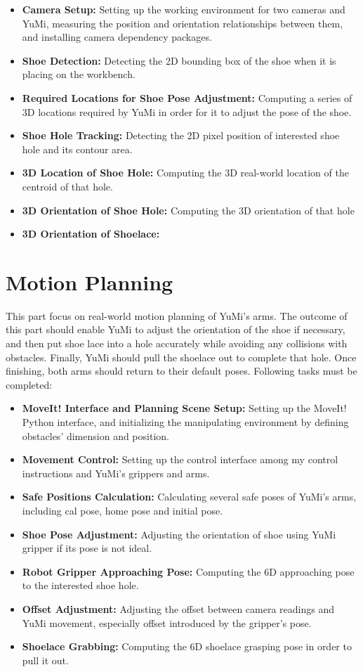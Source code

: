 \begin{itemize}
    \item \textbf{Camera Setup:} Setting up the working environment for two cameras and YuMi, measuring the position and orientation relationships between them, and installing camera dependency packages.
    \item \textbf{Shoe Detection:} Detecting the 2D bounding box of the shoe when it is placing on the workbench.
    \item \textbf{Required Locations for Shoe Pose Adjustment:} Computing a series of 3D locations required by YuMi in order for it to adjust the pose of the shoe.
    \item \textbf{Shoe Hole Tracking:} Detecting the 2D pixel position of interested shoe hole and its contour area.
    \item \textbf{3D Location of Shoe Hole:} Computing the 3D real-world location of the centroid of that hole.
    \item \textbf{3D Orientation of Shoe Hole:} Computing the 3D orientation of that hole
    \item \textbf{3D Orientation of Shoelace:}
\end{itemize}


\section{Motion Planning}
This part focus on real-world motion planning of YuMi's arms. The outcome of this part should enable YuMi to adjust the orientation of the shoe if necessary, and then put shoe lace into a hole accurately while avoiding any collisions with obstacles. Finally, YuMi should pull the shoelace out to complete that hole. Once finishing, both arms should return to their default poses. Following tasks must be completed:

\begin{itemize}
    \item \textbf{MoveIt! Interface and Planning Scene Setup:} Setting up the MoveIt! Python interface, and initializing the manipulating environment by defining obstacles' dimension and position.
    \item \textbf{Movement Control:} Setting up the control interface among my control instructions and YuMi's grippers and arms.
    \item \textbf{Safe Positions Calculation:} Calculating several safe poses of YuMi's arms, including cal pose, home pose and initial pose.
    \item \textbf{Shoe Pose Adjustment:} Adjusting the orientation of shoe using YuMi gripper if its pose is not ideal. 
    \item \textbf{Robot Gripper Approaching Pose:} Computing the 6D approaching pose to the interested shoe hole.
    \item \textbf{Offset Adjustment:} Adjusting the offset between camera readings and YuMi movement, especially offset introduced by the gripper's pose.
    \item \textbf{Shoelace Grabbing:} Computing the 6D shoelace grasping pose in order to pull it out.
\end{itemize}




